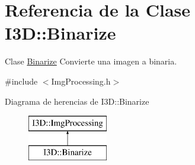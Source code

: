 \hypertarget{class_i3_d_1_1_binarize}{}\section{Referencia de la Clase I3D\+:\+:Binarize}
\label{class_i3_d_1_1_binarize}


Clase \hyperlink{class_i3_d_1_1_binarize}{Binarize} Convierte una imagen a binaria.  




{\ttfamily \#include $<$Img\+Processing.\+h$>$}

Diagrama de herencias de I3D\+:\+:Binarize\begin{figure}[H]
\begin{center}
\leavevmode
\includegraphics[height=2.000000cm]{class_i3_d_1_1_binarize}
\end{center}
\end{figure}
